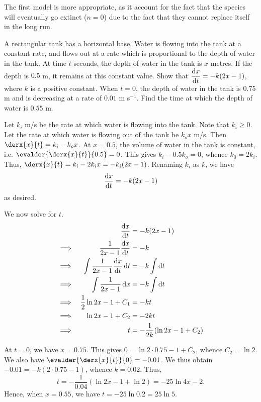 \documentclass{echw}
\begin{document}
        The first model is more appropriate, as it account for the fact that the species will eventually go extinct ($n = 0$) due to the fact that they cannot replace itself in the long run.

    \problem{}
        A rectangular tank has a horizontal base. Water is flowing into the tank at a constant rate, and flows out at a rate which is proportional to the depth of water in the tank. At time $t$ seconds, the depth of water in the tank is $x$ metres. If the depth is $0.5$ m, it remains at this constant value. Show that $\dfrac{\mathrm{d} x}{\mathrm{d} t} = -k(2x-1)$, where $k$ is a positive constant. When $t = 0$, the depth of water in the tank is $0.75$ m and is decreasing at a rate of $0.01$ m s$^{-1}$. Find the time at which the depth of water is $0.55$ m.
        
    \solution
        Let $k_i$ m/s be the rate at which water is flowing into the tank. Note that $k_i \geq 0$. Let the rate at which water is flowing out of the tank be $k_o x$ m/s. Then $\derx{x}{t} = k_i - k_o x$. At $x = 0.5$, the volume of water in the tank is constant, i.e. $\evalder{\derx{x}{t}}{0.5} = 0$. This gives $k_i - 0.5 k_o = 0$, whence $k_0 = 2k_i$. Thus, $\derx{x}{t} = k_i - 2k_i x = -k_i (2x - 1)$. Renaming $k_i$ as $k$, we have \[\dfrac{\mathrm{d} x}{\mathrm{d} t} = -k(2x - 1)\] as desired.

        We now solve for $t$.
        \begin{alignat*}{2}
            &&\dfrac{\mathrm{d} x}{\mathrm{d} t} &= -k(2x - 1)\\
            \implies&& \dfrac{1}{2x-1} \dfrac{\mathrm{d} x}{\mathrm{d} t} &= -k\\
            \implies&& \int \dfrac{1}{2x-1} \dfrac{\mathrm{d} x}{\mathrm{d} t} \mathop{\mathrm{d}t} &= -k \int \mathop{\mathrm{d}t}\\
            \implies&& \int \dfrac{1}{2x-1} \mathop{\mathrm{d}x} &= -k \int \mathop{\mathrm{d}t}\\
            \implies&& \dfrac12 \ln{2x-1} + C_1 &= -kt \\
            \implies&& \ln{2x-1} + C_2 &= -2kt\\
            \implies&& t &= -\dfrac{1}{2k}(\ln{2x-1} + C_2)
        \end{alignat*}

        At $t = 0$, we have $x = 0.75$. This gives $0 = \ln{2 \cdot 0.75 - 1} + C_2$, whence $C_2 = \ln2$. We also have $\evalder{\derx{x}{t}}{0} = -0.01$. We thus obtain $-0.01 = -k(2 \cdot 0.75 -1)$, whence $k = 0.02$. Thus, \[t = -\dfrac{1}{0.04}(\ln{2x-1} + \ln2) = -25 \ln{4x-2}.\] Hence, when $x = 0.55$, we have $t = -25\ln 0.2 = 25\ln5$.
\end{document}
